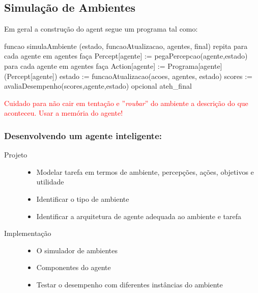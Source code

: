 \subsection{Simulação de Ambientes}
\begin{frame}

\begin{block}{Em geral a construção do agent segue um programa tal como:}
  

  funcao simulaAmbiente (estado, funcaoAtualizacao, 
                         agentes, final)
repita
	para cada agente em agentes faça
		 Percept[agente] := pegaPercepcao(agente,estado)
	para cada agente em agentes faça
		 Action[agente] := Programa[agente] (Percept[agente])
      estado := funcaoAtualizacao(acoes, agentes, estado)
	  scores := avaliaDesempenho(scores,agente,estado) 
	            opcional
ateh\_final

  
 \textcolor{red}{ Cuidado para não cair em tentação e ''\textit{roubar}” \/ do ambiente a descrição do que aconteceu. Usar a memória do agente!}
 
 
 
\end{block}  
    
  
\end{frame}

\begin{frame}
\frametitle{Desenvolvendo um agente inteligente:}
\begin{block}{}

\begin{description}
  \item[Projeto]
  
  \begin{itemize}
    \item Modelar tarefa em termos de ambiente, percepções, ações, objetivos e utilidade
    \item Identificar o tipo de ambiente
    \item Identificar a arquitetura de agente adequada ao ambiente e tarefa
  \end{itemize}
  
  \item[Implementação]
   
   \begin{itemize}
     \item O simulador de ambientes
     \item Componentes do agente 
     \item Testar o desempenho com diferentes instâncias do ambiente
   \end{itemize}
      
\end{description}

\end{block}  
 
\end{frame}

